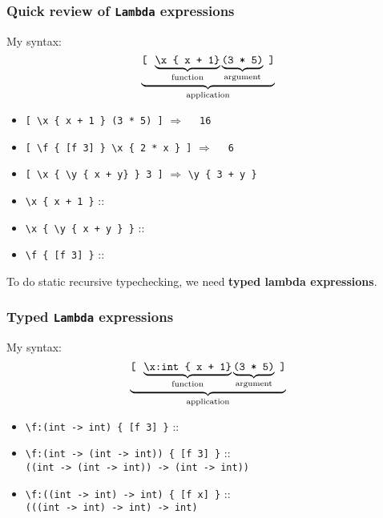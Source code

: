 \documentclass{beamer}
\begin{document}
\begin{frame}[fragile]
\frametitle{Quick review of {\tt Lambda} expressions}
My syntax:
\[
\underbrace{
  \text{\tt [ }
  \underbrace{\text{\tt \textbackslash x \{ x + 1\}}}_{\text{function}}
  \underbrace{\text{\tt (3 * 5)}}_{\text{argument}}
  \text{ \tt ]}
}_{\text{application}}
\]
\pause
\begin{itemize}
\item \verb|[ \x { x + 1 } (3 * 5) ]|  $\Rightarrow$ \pause \verb|  16| \pause
\item \verb|[ \f { [f 3] } \x { 2 * x } ]|  $\Rightarrow$ \pause \verb|  6|\pause
\item \verb|[ \x { \y { x + y} } 3 ]|  $\Rightarrow$ \pause \verb|\y { 3 + y }| \pause
\end{itemize}
\begin{itemize}
\item \verb|\x { x + 1 }|  :: \pause
\item \verb|\x { \y { x + y } }| ::  \pause
\item \verb|\f { [f 3] }| :: 
\end{itemize}
\pause
To do static  recursive typechecking, we need 
{\bf typed lambda expressions}.

\end{frame}

\begin{frame}[fragile]
\frametitle{Typed {\tt Lambda} expressions}
My syntax:
\[
\underbrace{
  \text{\tt [ }
  \underbrace{\text{\tt \textbackslash x:int \{ x + 1\}}}_{\text{function}}
  \underbrace{\text{\tt (3 * 5)}}_{\text{argument}}
  \text{ \tt ]}
}_{\text{application}}
\]
\pause

\begin{itemize}
\item \verb|\f:(int -> int) { [f 3] }| :: 
\item \verb|\f:(int -> (int -> int)) { [f 3] }| :: \pause \\
{\tt ((int -> (int -> int)) -> (int -> int))}
\item \verb|\f:((int -> int) -> int) { [f x] }| :: \pause \\
{\tt (((int -> int) -> int) -> int)}
\end{itemize}

\end{frame}
\end{document}
